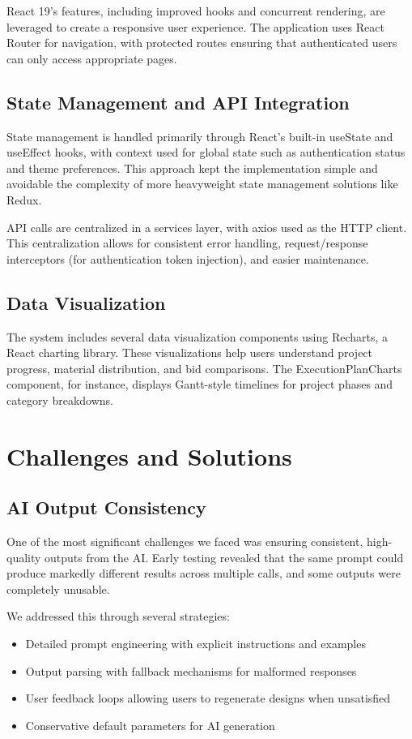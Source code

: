 \documentclass[conference]{IEEEtran}
\begin{document}
React 19's features, including improved hooks and concurrent rendering, are leveraged to create a responsive user experience. The application uses React Router for navigation, with protected routes ensuring that authenticated users can only access appropriate pages.

\subsection{State Management and API Integration}
State management is handled primarily through React's built-in useState and useEffect hooks, with context used for global state such as authentication status and theme preferences. This approach kept the implementation simple and avoidable the complexity of more heavyweight state management solutions like Redux.

API calls are centralized in a services layer, with axios used as the HTTP client. This centralization allows for consistent error handling, request/response interceptors (for authentication token injection), and easier maintenance.

\subsection{Data Visualization}
The system includes several data visualization components using Recharts, a React charting library. These visualizations help users understand project progress, material distribution, and bid comparisons. The ExecutionPlanCharts component, for instance, displays Gantt-style timelines for project phases and category breakdowns.

\section{Challenges and Solutions}

\subsection{AI Output Consistency}
One of the most significant challenges we faced was ensuring consistent, high-quality outputs from the AI. Early testing revealed that the same prompt could produce markedly different results across multiple calls, and some outputs were completely unusable.

We addressed this through several strategies:
\begin{itemize}
    \item Detailed prompt engineering with explicit instructions and examples
    \item Output parsing with fallback mechanisms for malformed responses
    \item User feedback loops allowing users to regenerate designs when unsatisfied
    \item Conservative default parameters for AI generation
\end{itemize}
\end{document}
